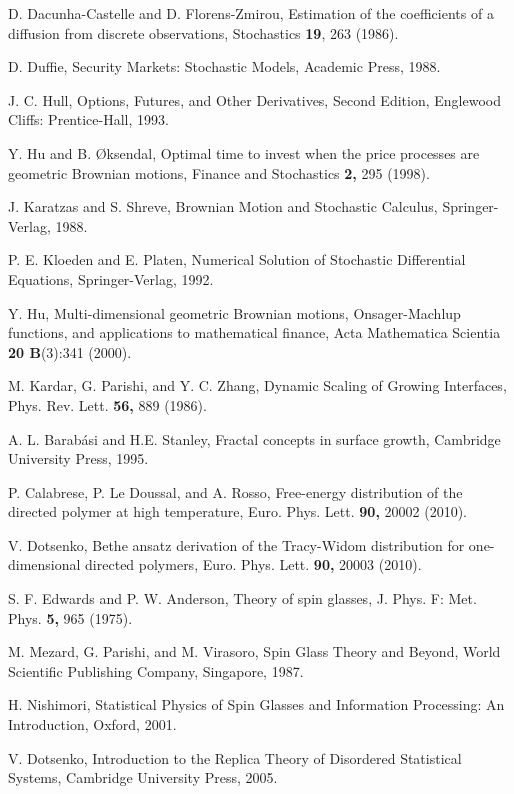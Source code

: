 \documentclass[
aps,
pre,
showpacs
]{revtex4-1}
\begin{document}
\begin{thebibliography}{99}
D. Dacunha-Castelle and D. Florens-Zmirou,
{Estimation of the coefficients of a diffusion from discrete observations},
Stochastics {\bf19}, 263 (1986).

D. Duffie,
{Security Markets: Stochastic Models},
Academic Press, 1988.

J. C. Hull,
{Options, Futures, and Other Derivatives, Second Edition},
Englewood Cliffs: Prentice-Hall, 1993.

Y. Hu and B. {\O}ksendal,
{Optimal time to invest when the price processes are geometric Brownian motions},
Finance and Stochastics {\bf2,} 295 (1998).

J. Karatzas and S. Shreve,
{Brownian Motion and Stochastic Calculus},
Springer-Verlag, 1988.

P. E. Kloeden and E. Platen,
{Numerical Solution of Stochastic Differential Equations},
Springer-Verlag, 1992.


Y. Hu,
{Multi-dimensional geometric Brownian motions, Onsager-Machlup functions, and applications to mathematical finance},
Acta Mathematica Scientia {\bf20 B}(3):341 (2000).


M. Kardar, G. Parishi, and Y. C. Zhang,
{Dynamic Scaling of Growing Interfaces},
Phys. Rev. Lett. {\bf56,} 889 (1986).

A. L. Barab\'{a}si and H.E. Stanley,
{Fractal concepts in surface growth},
Cambridge University Press, 1995.

P. Calabrese, P. Le Doussal, and A. Rosso,
{Free-energy distribution of the directed polymer at high temperature},
Euro. Phys. Lett. {\bf90,} 20002 (2010).

V. Dotsenko,
{Bethe ansatz derivation of the Tracy-Widom distribution for one-dimensional directed polymers},
Euro. Phys. Lett. {\bf90,} 20003 (2010).


S. F. Edwards and P. W. Anderson,
{Theory of spin glasses},
J. Phys. F: Met. Phys. {\bf5,} 965 (1975).

M. Mezard, G. Parishi, and M. Virasoro,
{Spin Glass Theory and Beyond},
World Scientific Publishing Company, Singapore, 1987.

H. Nishimori,
{Statistical Physics of Spin Glasses and Information Processing: An Introduction},
Oxford, 2001.

V. Dotsenko,
{Introduction to the Replica Theory of Disordered Statistical Systems},
Cambridge University Press, 2005.



\end{thebibliography}
\end{document}
